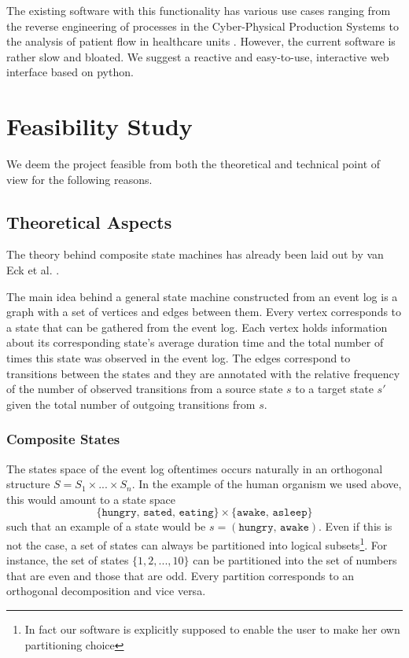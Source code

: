 \documentclass[12pt]{extarticle}
\begin{document}
The existing software \cite{prom} with this functionality has various use cases ranging from the reverse engineering of processes in the Cyber-Physical Production Systems\cite{cpps} to the analysis of patient flow in healthcare units \cite{patient}. However, the current software is rather slow and bloated. We suggest a reactive and easy-to-use, interactive web interface based on python.

\section{Feasibility Study}

We deem the project feasible from both the theoretical and technical point of view for the following reasons.

\subsection{Theoretical Aspects}

The theory behind composite state machines has already been laid out by van Eck et al. \cite{csm-intro}. 


The main idea behind a general state machine constructed from an event log is a graph with a set of vertices and edges between them. Every vertex corresponds to a state that can be gathered from the event log. Each vertex holds information about its corresponding state's average duration time and the total number of times this state was observed in the event log. The edges correspond to transitions between the states and they are annotated with the relative frequency of the number of observed transitions from a source state $s$ to a target state $s'$ given the total number of outgoing transitions from $s$.

\subsubsection{Composite States}

The states space of the event log oftentimes occurs naturally in an orthogonal structure $S = S_1 \times ... \times S_n$. In the example of the human organism we used above, this would amount to a state space
\[ \{ \texttt{hungry, sated, eating} \} \times \{ \texttt{awake, asleep} \} \]
such that an example of a state would be $s = (\texttt{hungry, awake})$. Even if this is not the case, a set of states can always be partitioned into logical subsets\footnote{In fact our software is explicitly supposed to enable the user to make her own partitioning choice}. For instance, the set of states $\{1, 2, ..., 10\}$ can be partitioned into the set of numbers that are even and those that are odd. Every partition corresponds to an orthogonal decomposition and vice versa.
\end{document}
